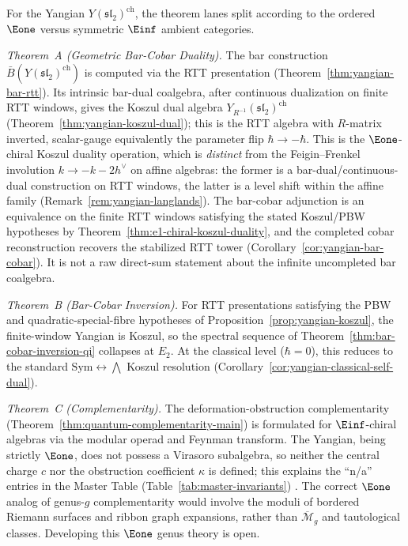 \begin{remark}
\label{rem:yangian-three-theorems}
For the Yangian $Y(\mathfrak{sl}_2)^{\mathrm{ch}}$, the theorem lanes
split according to the ordered $\Eone$ versus symmetric $\Einf$
ambient categories.

\emph{Theorem~A (Geometric Bar-Cobar Duality).}
The bar construction $\bar{B}(Y(\mathfrak{sl}_2)^{\mathrm{ch}})$
is computed via the RTT presentation
(Theorem~\ref{thm:yangian-bar-rtt}). Its intrinsic bar-dual coalgebra,
after continuous dualization on finite RTT windows, gives the
Koszul dual algebra
$Y_{R^{-1}}(\mathfrak{sl}_2)^{\mathrm{ch}}$
(Theorem~\ref{thm:yangian-koszul-dual}); this is the RTT algebra with
$R$-matrix inverted, scalar-gauge equivalently the parameter flip
$\hbar \to -\hbar$. This is the $\Eone$-chiral Koszul duality
operation, which is \emph{distinct} from the Feigin--Frenkel
involution $k \to -k - 2h^\vee$ on affine algebras:
the former is a bar-dual/continuous-dual construction on RTT windows,
the latter is a level shift within the affine family
\textup{(}Remark~\ref{rem:yangian-langlands}\textup{)}.
The bar-cobar adjunction is an
equivalence on the finite RTT windows satisfying the stated
Koszul/PBW hypotheses by Theorem~\ref{thm:e1-chiral-koszul-duality},
and the completed cobar reconstruction recovers the stabilized RTT
tower
\textup{(}Corollary~\ref{cor:yangian-bar-cobar}\textup{)}. It is not
a raw direct-sum statement about the infinite uncompleted bar
coalgebra.

\emph{Theorem~B (Bar-Cobar Inversion).}
For RTT presentations satisfying the PBW and quadratic-special-fibre
hypotheses of Proposition~\ref{prop:yangian-koszul}, the finite-window
Yangian is Koszul, so the spectral sequence of
Theorem~\ref{thm:bar-cobar-inversion-qi} collapses at $E_2$.
At the classical level ($\hbar = 0$), this reduces to the standard
$\mathrm{Sym} \leftrightarrow \bigwedge$ Koszul resolution
(Corollary~\ref{cor:yangian-classical-self-dual}).

\emph{Theorem~C (Complementarity).}
The deformation-obstruction complementarity
(Theorem~\ref{thm:quantum-complementarity-main}) is formulated for
$\Einf$-chiral algebras via the modular operad and Feynman transform.
The Yangian, being strictly $\Eone$, does not possess a Virasoro
subalgebra, so neither the central charge $c$ nor the obstruction
coefficient $\kappa$ is defined; this explains the ``n/a'' entries
in the Master Table \ifannalsedition\else
(Table~\ref{tab:master-invariants})
\fi. The correct
$\Eone$ analog of genus-$g$ complementarity would involve the moduli
of bordered Riemann surfaces and ribbon graph expansions, rather than
$\overline{\mathcal{M}}_g$ and tautological classes. Developing this
$\Eone$ genus theory is open.
\end{remark}


